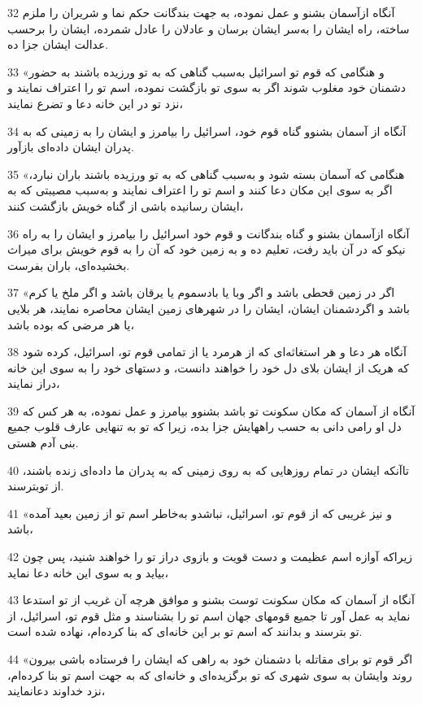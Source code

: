 \par 32 آنگاه ازآسمان بشنو و عمل نموده، به جهت بندگانت حکم نما و شریران را ملزم ساخته، راه ایشان را به‌سر ایشان برسان و عادلان را عادل شمرده، ایشان را بر‌حسب عدالت ایشان جزا ده.
\par 33 «و هنگامی که قوم تو اسرائیل به‌سبب گناهی که به تو ورزیده باشند به حضور دشمنان خود مغلوب شوند اگر به سوی تو بازگشت نموده، اسم تو را اعتراف نمایند و نزد تو در این خانه دعا و تضرع نمایند،
\par 34 آنگاه از آسمان بشنوو گناه قوم خود، اسرائیل را بیامرز و ایشان را به زمینی که به پدران ایشان داده‌ای بازآور.
\par 35 «هنگامی که آسمان بسته شود و به‌سبب گناهی که به تو ورزیده باشند باران نبارد، اگر به سوی این مکان دعا کنند و اسم تو را اعتراف نمایند و به‌سبب مصیبتی که به ایشان رسانیده باشی از گناه خویش بازگشت کنند،
\par 36 آنگاه ازآسمان بشنو و گناه بندگانت و قوم خود اسرائیل را بیامرز و ایشان را به راه نیکو که در آن باید رفت، تعلیم ده و به زمین خود که آن را به قوم خویش برای میراث بخشیده‌ای، باران بفرست.
\par 37 «اگر در زمین قحطی باشد و اگر وبا یا بادسموم یا یرقان باشد و اگر ملخ یا کرم باشد و اگردشمنان ایشان، ایشان را در شهرهای زمین ایشان محاصره نمایند، هر بلایی یا هر مرضی که بوده باشد،
\par 38 آنگاه هر دعا و هر استغاثه‌ای که از هرمرد یا از تمامی قوم تو، اسرائیل، کرده شود که هریک از ایشان بلای دل خود را خواهند دانست، و دستهای خود را به سوی این خانه دراز نمایند،
\par 39 آنگاه از آسمان که مکان سکونت تو باشد بشنوو بیامرز و عمل نموده، به هر کس که دل او رامی دانی به حسب راههایش جزا بده، زیرا که تو به تنهایی عارف قلوب جمیع بنی آدم هستی.
\par 40 تاآنکه ایشان در تمام روزهایی که به روی زمینی که به پدران ما داده‌ای زنده باشند، از توبترسند.
\par 41 «و نیز غریبی که از قوم تو، اسرائیل، نباشدو به‌خاطر اسم تو از زمین بعید آمده باشد،
\par 42 زیراکه آوازه اسم عظیمت و دست قویت و بازوی دراز تو را خواهند شنید، پس چون بیاید و به سوی این خانه دعا نماید،
\par 43 آنگاه از آسمان که مکان سکونت توست بشنو و موافق هر‌چه آن غریب از تو استدعا نماید به عمل آور تا جمیع قومهای جهان اسم تو را بشناسند و مثل قوم تو، اسرائیل، از تو بترسند و بدانند که اسم تو بر این خانه‌ای که بنا کرده‌ام، نهاده شده است.
\par 44 «اگر قوم تو برای مقاتله با دشمنان خود به راهی که ایشان را فرستاده باشی بیرون روند وایشان به سوی شهری که تو برگزیده‌ای و خانه‌ای که به جهت اسم تو بنا کرده‌ام، نزد خداوند دعانمایند،
